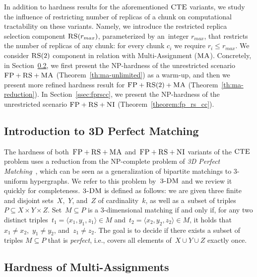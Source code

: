 In addition to hardness results for the aforementioned $\textsc{CTE}$ variants, we study the influence of restricting number of replicas of a chunk on computational tractability on these variants.
Namely, we introduce the restricted replica selection component $\textsc{RS}(r_{max})$, parameterized by an~integer $r_{max}$, that restricts the number of replicas of any chunk: for every chunk $c_i$ we require $r_i \leq r_{max}$.
We consider $\textsc{RS}(2)$ component in relation with Multi-Assignment ($\textsc{MA}$).
Concretely, in Section~\ref{ssec:fprsma}, we first present the NP-hardness of the unrestricted scenario $\textsc{FP}+\textsc{RS}+\textsc{MA}$ (Theorem~\ref{th:ma-unlimited}) as a warm-up,
and then we present more refined hardness result for ${\textsc{FP}+\textsc{RS}(2)+\textsc{MA}}$ (Theorem~\ref{th:ma-reduction}).
In Section~\ref{ssec:fprscc}, we present the NP-hardness of the unrestricted scenario $\textsc{FP}+\textsc{RS}+\textsc{NI}$ (Theorem~\ref{theorem:fp_rs_cc}).

\subsection{Introduction to 3D Perfect Matching}
\label{sec:3dm_intro}

The hardness of both~$\textsc{FP}+\textsc{RS}+\textsc{MA}$ and~$\textsc{FP}+\textsc{RS}+\textsc{NI}$ variants of the $\textsc{CTE}$ problem uses a reduction
from the NP-complete problem of \emph{3D Perfect Matching}~\cite{3dmatch},
which can be seen as a generalization of bipartite matchings to 3-uniform
hypergraphs. We refer to this problem by~$\textsc{3-DM}$ and we
review it quickly for completeness.
$\textsc{3-DM}$ is defined as follows: we are given three finite and disjoint
sets~$X$,~$Y$, and~$Z$ of cardinality~$k$, as well as a~subset of triples~$P\subseteq
X \times Y \times Z$.  Set~$M \subseteq P$ is a 3-dimensional matching
if and only if, for any two distinct triples~$t_1=\langle x_1, y_1, z_1\rangle \in M$
and~$t_2= \langle x_2, y_2, z_2 \rangle \in M$, it holds that~$x_1\neq x_2$,~$y_1\neq
y_2$, and~$z_1\neq z_2$. The goal is to decide if there exists
a subset of triples $M \subseteq P$ that is \emph{perfect}, i.e., covers all
elements of~$X \cup Y \cup Z$ exactly once.


\subsection{Hardness of Multi-Assignments}\label{ssec:fprsma}

